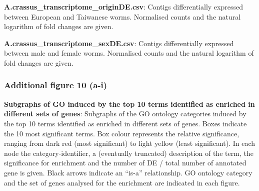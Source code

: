 \documentclass[10pt]{bmc_article}
\newenvironment{bmcformat}{\begin{raggedright}\baselineskip20pt\sloppy\setboolean{publ}{false}}{\end{raggedright}\baselineskip20pt\sloppy}
\begin{document}
\begin{bmcformat}
\textbf{A.crassus\_transcriptome\_originDE.csv}: Contigs
differentially expressed between European and Taiwanese
worms. Normalised counts and the natural logarithm of fold changes are
given.

\textbf{A.crassus\_transcriptome\_sexDE.csv}: Contigs differentially
expressed between male and female worms. Normalised counts and the
natural logarithm of fold changes are given.

\subsubsection*{Additional figure 10 (a-i)}
\textbf{Subgraphs of GO induced by the top 10 terms identified as
  enriched in different sets of genes}: Subgraphs of the GO ontology
categories induced by the top 10 terms identified as enriched in
different sets of genes. Boxes indicate the 10 most significant
terms. Box colour represents the relative significance, ranging from
dark red (most significant) to light yellow (least significant). In
each node the category-identifier, a (eventually truncated)
description of the term, the significance for enrichment and the
number of DE / total number of annotated gene is given. Black arrows
indicate an ``is-a'' relationship. GO ontology category and the set of
genes analysed for the enrichment are indicated in each figure.

\end{bmcformat}
\end{document}
